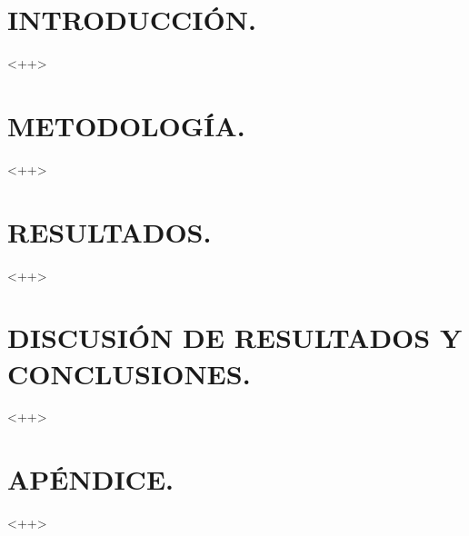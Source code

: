 \documentclass[12pt,a4paper]{article}
\begin{document}
\mytitlepage

\section{INTRODUCCIÓN.} %

<++>


\section{METODOLOGÍA.} %

<++>


\section{RESULTADOS.} %

<++>


\section{DISCUSIÓN DE RESULTADOS Y CONCLUSIONES.} %

<++>


% 
% 

\section{APÉNDICE.} %

<++>

\end{document}
